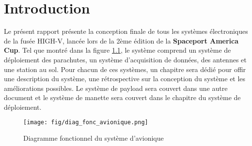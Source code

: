 \chapter{Introduction}
\label{chap:intro}

Le présent rapport présente la conception finale de tous les systèmes
électroniques de la fusée HIGH-V, lancée lors de la 2ème édition de la
\textbf{Spaceport America Cup}. Tel que montré dans la figure
\ref{f:diag_fonc_avionique}, le système comprend un système de déploiement des
parachutes, un système d'acquisition de données, des antennes et une station
au sol. Pour chacun de ces systèmes, un chapitre sera dédié pour offir une
description du système, une rétrospective sur la conception du système et les
améliorations possibles. Le système de payload sera couvert dans une autre
document et le système de manette sera couvert dans le chapitre du système
de déploiement.

\begin{figure}[H]
	\center
	\texttt{[image: fig/diag\_fonc\_avionique.png]}
	\caption{Diagramme fonctionnel du système d'avionique}
	\label{f:diag_fonc_avionique}
\end{figure}
